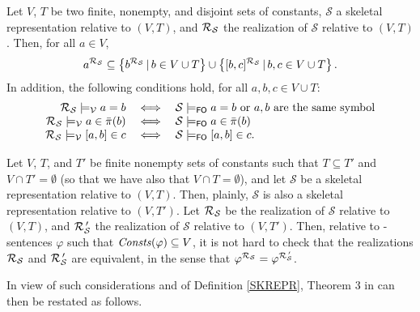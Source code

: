 \documentclass[manyauthors]{fundam}
\newcommand{\pair}[2]{[#1,#2]}
\newcommand{\nonpairssym}{\bar{\pi}}
\newcommand{\nonpairs}[1]{\nonpairssym(#1)}
\newcommand{\pairin}[3]{\left[#1,#2\right] \in #3}
\newcommand{\nonpairin}[2]{#1 \in \bar{\pi}(#2)}
\newcommand{\seteq}[2]{#1=#2}
\newcommand{\atset}{\mathcal{S}}
\newcommand{\consta}{a}
\newcommand{\constb}{b}
\newcommand{\constc}{c}
\newcommand{\red}[1]{\textcolor{red}{#1}}
\newcommand{\fomodels}[2]{#1 \models_{\mathsf{FO}} #2}
\newcommand{\vmodels}[2]{#1 \models_{\mathcal{V}} #2}
\begin{document}
\begin{lemma}\label{REALIZATION}
Let $V$, $T$ be two finite, nonempty, and disjoint sets of constants, 
$\atset$ a
skeletal representation relative to $(V,T)$, and $\Realization_{\!\atset}$
the realization of $\atset$ relative to $(V,T)$. Then, for all $\consta \in V$,
\[
\consta^{\Realization_{\!\atset}} \subseteq \left\{ 
\constb^{\Realization_{\!\atset}} \,|\, \constb \in V \cup T \right\} 
\cup
  \left\{ [\constb, \constc]^{\Realization_{\!\atset}} \,|\, \constb, 
\constc \in V \cup T \right\} .
\]
In addition, the following conditions hold,
for all $\consta, \constb, \constc \in V \cup T$:
\[
\begin{array}{rcl}
   \vmodels{\Realization_{\!\atset}}{\consta = \constb}& \iff  & \fomodels{\atset}{\seteq{\consta}{\constb}} 
\mbox{ or }\consta, \constb\mbox{ are the same symbol}\\
   \vmodels{\Realization_{\!\atset}}{\consta \in \nonpairs{\constb}} & 
\iff & \fomodels{\atset}{\nonpairin{\consta}{\constb}}\\
   \vmodels{\Realization_{\!\atset}}{\pair{\consta}{\constb} \in 
\constc} & \iff & 
\fomodels{\atset}{\pairin{\consta}{\constb}{\constc}} .
\end{array}
\]
\end{lemma}
%

Let $V$, $T$, and $T'$ be finite nonempty sets of constants such that 
$T \subseteq T'$ and $V \cap T' = \emptyset$ (so that we have also 
that $V \cap T = \emptyset$), and let $\atset$ be a skeletal 
representation relative to $(V,T)$. Then, plainly, $\atset$ is also a 
skeletal representation relative to $(V,T')$. Let 
$\Realization_{\!\atset}$ be the realization of $\atset$  relative to 
$(V,T)$, and $\Realization'_{\!\atset}$ the realization of $\atset$ 
relative to $(V,T')$. Then, relative to \Forallpizero-sentences 
$\varphi$ such that $\mathit{Consts}(\varphi) \subseteq V$, it is not hard to 
check that the realizations $\Realization_{\!\atset}$ and 
$\Realization'_{\!\atset}$ are equivalent, in the sense that 
$\varphi^{\Realization_{\!\atset}} = 
\varphi^{\Realization'_{\!\atset}}$.

In view of such considerations and of Definition \ref{SKREPR}, 
Theorem 3 in \cite{CanLonNic2011} can then be restated as follows.
\end{document}
